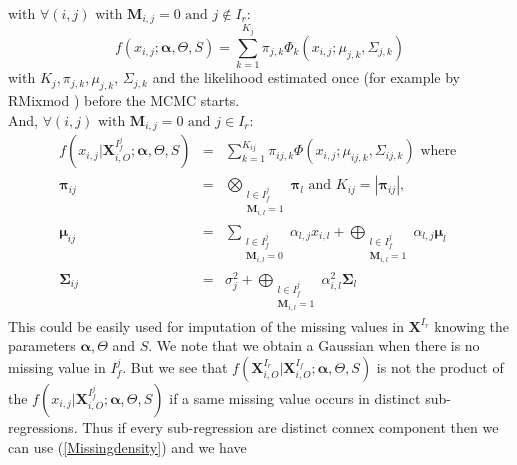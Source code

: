 \documentclass[12pt,a4paper]{report}
\begin{document}
with	  $\forall (i,j) \textrm{ with } \boldsymbol{M}_{i,j}= 0 \textrm{ and } j \notin I_r $:
	 \begin{equation}
	 f(x_{i,j};\boldsymbol{\alpha},\Theta,S)=\sum_{k=1}^{K_j}\pi_{j,k}\Phi_k(x_{i,j};\mu_{j,k},\Sigma_{j,k}) \label{likmissdroite}
	 \end{equation} with $K_j,\pi_{j,k}, \mu_{j,k}$, $\Sigma_{j,k}$ and the likelihood estimated once (for example by RMixmod \cite{packageRmixmod}) before the MCMC starts. 
\\
	 And, $\forall (i,j) \textrm{ with } \boldsymbol{M}_{i,j}= 0 \textrm{ and } j \in I_r $:
		\begin{eqnarray}
 f(x_{i,j}|\boldsymbol{X}_{i,O}^{I_f^j};\boldsymbol{\alpha},\Theta,S)&=& \sum_{k=1}^{K_{ij}}\pi_{ij,k}\Phi(x_{i,j};\mu_{ij,k},\Sigma_{ij,k}) \textrm{ where }  \label{Missingdensity}\\
				\boldsymbol{\pi}_{ij} &=& \bigotimes_{\substack{l \in I_f^j \\ \boldsymbol{M}_{i,l}=1 } } \boldsymbol{\pi}_l \textrm{ and  }K_{ij}=|\boldsymbol{\pi}_{ij}| ,\\
				\boldsymbol{\mu}_{ij}&=& \sum_{\substack{l \in I_f^j \\ \boldsymbol{M}_{i,l}=0  }}\alpha_{l,j}x_{i,l} + \bigoplus_{\substack{l \in I_f^j \\ \boldsymbol{M}_{i,l}=1  }} \alpha_{l,j} \boldsymbol{\mu}_l \\
				\boldsymbol{\Sigma}_{ij} &=& \sigma_j^2 + \bigoplus_{\substack{l \in I_f^j \\ \boldsymbol{M}_{i,l}=1 }}\alpha_{i,l}^2 \boldsymbol{\Sigma}_l		
		\end{eqnarray}		 
		This could be easily used for imputation of the missing values in $\boldsymbol{X}^{I_r}$ knowing the parameters $\boldsymbol{\alpha}, \Theta$ and $S$. We note that we obtain a Gaussian when there is no missing value in $I_f^j$.
		But we see that	$f(\boldsymbol{X}^{I_r}_{i,O}|\boldsymbol{X}^{I_f}_{i,O};\boldsymbol{\alpha},\Theta,S)$ is not the product of the $f(x_{i,j}|\boldsymbol{X}_{i,O}^{I_f^j};\boldsymbol{\alpha},\Theta,S) $	if a same missing value occurs in distinct sub-regressions. Thus if every sub-regression are distinct connex component then we can use (\ref{Missingdensity}) and we have
\end{document}
